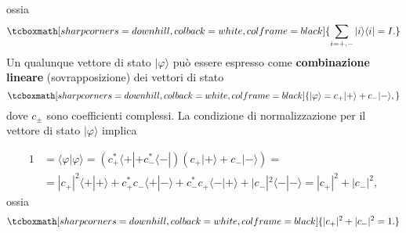 ossia
	\begin{equation}
		\tcboxmath[sharp corners=downhill, colback=white, colframe=black]{
			\sum \limits_{i=+,-} | i \rangle \langle i | = I .
			}
	\end{equation}
Un qualunque vettore di stato $| \varphi \rangle $ può essere espresso come \textbf{combinazione lineare} (sovrapposizione) dei vettori di stato
	\begin{equation}
		\tcboxmath[sharp corners=downhill, colback=white, colframe=black]{
			| \varphi \rangle = c_+ | + \rangle + c_- | - \rangle ,
			}
	\end{equation}
dove $c_{\pm}$ sono coefficienti complessi. La condizione di normalizzazione per il vettore di stato $ | \varphi \rangle $ implica

	\begin{equation}
		\begin{aligned}
			1 & =\langle \varphi | \varphi \rangle = (c^*_+\langle + | +c^*_- \langle - |)(c_+| + \rangle +c_- | - \rangle)=\\
			&=| c_+|^2\langle + | + \rangle +c^*_+c_- \langle + | - \rangle +c^*_-c_+ \langle - | + \rangle +|c_-|^2 \langle - | - \rangle =|c_+|^2+|c_-|^2 ,
				\end{aligned} 
	\end{equation}
ossia 
	\begin{equation}
		\tcboxmath[sharp corners=downhill, colback=white, colframe=black]{
			|c_+|^2+|c_-|^2=1 .
			}
	\end{equation}

